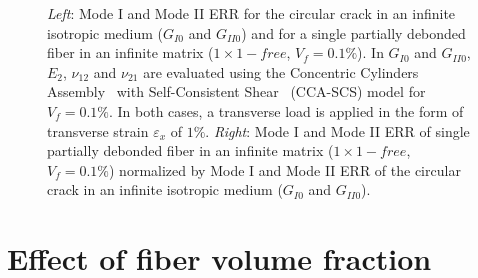\documentclass[review]{elsarticle}
\begin{document}
\begin{figure}[!h]
\caption{\textit{Left}: Mode I and Mode II ERR for the circular crack in an infinite isotropic medium ($G_{I0}$ and $G_{II0}$) and for a single partially debonded fiber in an infinite matrix ($1\times 1-free$, $V_{f}=0.1\%$). In $G_{I0}$ and $G_{II0}$, $E_{2}$, $\nu_{12}$ and $\nu_{21}$ are evaluated using the Concentric Cylinders Assembly~\cite{Hashin1983} with Self-Consistent Shear~\cite{Christensen1979} (CCA-SCS) model for $V_{f}=0.1\%$. In both cases, a transverse load is applied in the form of transverse strain $\varepsilon_{x}$ of $1\%$. \textit{Right}: Mode I and Mode II ERR of single partially debonded fiber in an infinite matrix ($1\times 1-free$, $V_{f}=0.1\%$) normalized by Mode I and Mode II ERR of the circular crack in an infinite isotropic medium ($G_{I0}$ and $G_{II0}$).}\label{fig:comparescalingVf01}
\end{figure}

\section{Effect of fiber volume fraction}
\end{document}

